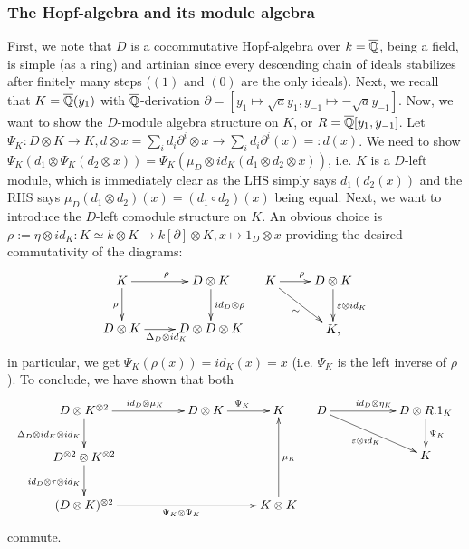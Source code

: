 \subsubsection{The Hopf-algebra and its module algebra}
First, we note that $D$ is a cocommutative Hopf-algebra over $k = \overline{\mathbb{Q}}$, being a field, is simple (as a ring) and artinian since every descending chain of ideals stabilizes after finitely many steps ($(1)$ and $(0)$ are the only ideals). Next, we recall that $K = \overline{\mathbb{Q}}(y_1)$ with $\overline{\mathbb{Q}}$-derivation $\partial = [y_1 \longmapsto \sqrt{a} y_1, y_{-1} \longmapsto - \sqrt{a} y_{-1}]$. Now, we want to show the $D$-module algebra structure on $K$, or $R = \overline{\mathbb{Q}}[y_1,y_{-1}]$. Let $\Psi_K : D \otimes K \longrightarrow K,  
d \otimes x = \sum_i d_i \partial^i \otimes x \longrightarrow \sum_i d_i \partial^i(x) =: d(x)$. We need to show $\Psi_K(d_1 \otimes \Psi_K(d_2 \otimes x)) = \Psi_K(\mu_D \otimes id_K(d_1 \otimes d_2 \otimes x))$, i.e. $K$ is a $D$-left module, which is immediately clear as the LHS simply says $d_1(d_2(x))$ and the RHS says $\mu_D(d_1 \otimes d_2)(x) = (d_1 \circ d_2)(x)$ being equal. Next, we want to introduce the $D$-left comodule structure on $K$. An obvious choice is $\rho := \eta \otimes id_K : K \simeq k \otimes K \longrightarrow k[\partial] \otimes K, x \longmapsto 1_D \otimes x$ providing the desired commutativity of the diagrams:
$$\bao{cc}
\xymatrix{
K \ar[r]^\rho \ar[d]_\rho & D \otimes K\ar[d]^{id_D \otimes \rho}\\
D \otimes K \ar[r]_{\Delta_D \otimes id_K} & D \otimes D \otimes K\\
} &
\xymatrix{
K \ar[r]^\rho \ar[rd]_\sim & D \otimes K\ar[d]^{\eps \otimes id_K}\\
&K,}\\
\ea$$
in particular, we get $\Psi_K(\rho(x)) = id_K(x) = x$ (i.e. $\Psi_K$ is the left inverse of $\rho$). To conclude, we have shown that both
$$\bao{cc}
\xymatrix{
D \otimes K^{\otimes2} \ar[d]_{\Delta_D \otimes id_K \otimes id_K} \ar[rr]^{id_D \otimes \mu_K}& & D \otimes K \ar[r]^{\Psi_K} & K\\
D^{\otimes2} \otimes K^{\otimes2} \ar[d]_{id_D \otimes \tau \otimes id_K}&&&\\
(D \otimes K)^{\otimes2} \ar[rrr]_{\Psi_K \otimes \Psi_K} & & &K \otimes K \ar[uu]_{\mu_K}\\
} &
\xymatrix{
D \ar[rr]^{id_D \otimes \eta_K} \ar[rrd]_{\eps \otimes id_K}&& D \otimes R.1_K\ar[d]^{\Psi_K}\\
&&K\\
}\\
\ea$$
commute. 

